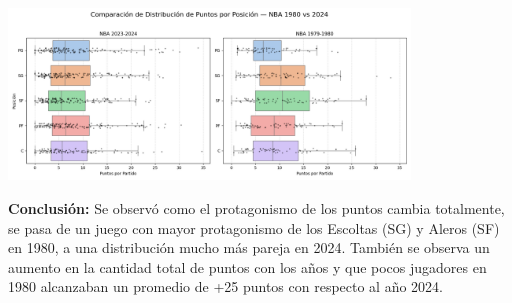\documentclass[12pt]{article}
\begin{document}
\begin{center}
    \includegraphics[width=0.8\textwidth]{boxplot.png}
\end{center}

\textbf{Conclusión:} Se observó como el protagonismo de los puntos cambia totalmente, se pasa de un juego con mayor protagonismo de los Escoltas (SG) y Aleros (SF) en 1980, a una distribución mucho más pareja en 2024. También se observa un aumento en la cantidad total de puntos con los años y que pocos jugadores en 1980 alcanzaban un promedio de +25 puntos con respecto al año 2024.
\end{document}
